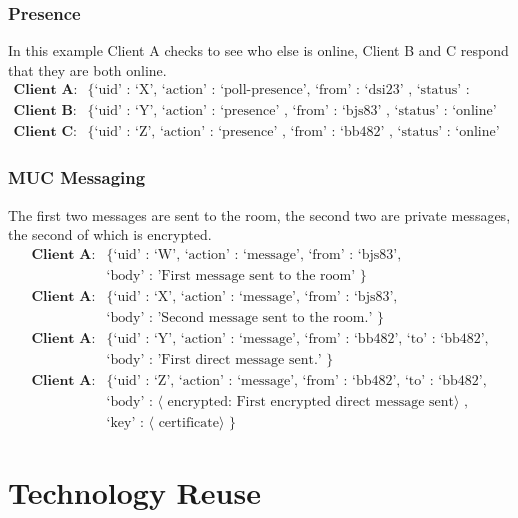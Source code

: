 \documentclass{article}
\begin{document}
\subsubsection{Presence}

In this example Client A checks to see who else is online, Client B and C respond
that they are both online.
\begin{align*}
\textbf{Client A}:& \text{\{ `uid' : `X', `action' : `poll-presence', `from' :
`dsi23' , `status' : `online' \}} \\
\textbf{Client B}:& \text{\{ `uid' : `Y', `action' : `presence' , `from' :
`bjs83' , `status' : `online' \}} \\
\textbf{Client C}:& \text{\{ `uid' : `Z', `action' : `presence' , `from' :
`bb482' , `status' : `online' \}} 
\end{align*}

\subsubsection{MUC Messaging}

The first two messages are sent to the room, the second two are private
messages, the second of which is encrypted.
\begin{align*}
\textbf{Client A}:& \text{\{ `uid' : `W', `action' : `message', `from' :
`bjs83',}\\
&\text{`body' : 'First message sent to the room' \}}\\
\textbf{Client A}:& \text{\{ `uid' : `X', `action' : `message', `from' :
`bjs83',}\\
&\text{`body' : 'Second message sent to the room.' \}}\\
\textbf{Client A}:& \text{\{ `uid' : `Y', `action' : `message', `from' : `bb482',
`to' : `bb482',}\\
&\text{`body' : 'First direct message sent.' \}}\\
\textbf{Client A}:& \text{\{ `uid' : `Z', `action' : `message', `from' : `bb482',
`to' : `bb482',}\\
&\text{`body' : $\langle$ encrypted: First encrypted direct message
sent$\rangle$ ,} \\
&\text{`key' : $\langle$ certificate$\rangle$ \}}
\end{align*}

\section{Technology Reuse}
\end{document}
